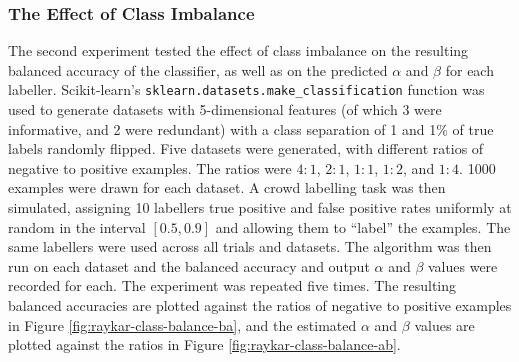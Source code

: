         \subsubsection{The Effect of Class Imbalance}

            The second experiment tested the effect of class imbalance on the
            resulting balanced accuracy of the classifier, as well as on the
            predicted $\alpha$ and $\beta$ for each labeller. Scikit-learn's
            \citep{scikit-learn} \texttt{sklearn.datasets.make\_classification}
            function was used to generate datasets with 5-dimensional features
            (of which 3 were informative, and 2 were redundant) with a class
            separation of 1 and 1\% of true labels randomly flipped. Five
            datasets were generated, with different ratios of negative to
            positive examples. The ratios were $4:1$, $2:1$, $1:1$, $1:2$, and
            $1:4$. 1000 examples were drawn for each dataset. A crowd labelling
            task was then simulated, assigning 10 labellers true positive and
            false positive rates uniformly at random in the interval $[0.5,
            0.9]$ and allowing them to ``label'' the examples. The same
            labellers were used across all trials and datasets. The
            \citeauthor{raykar10} algorithm was then run on each dataset and the
            balanced accuracy and output $\alpha$ and $\beta$ values were
            recorded for each. The experiment was repeated five times. The
            resulting balanced accuracies are plotted against the ratios of
            negative to positive examples in Figure
            \ref{fig:raykar-class-balance-ba}, and the estimated $\alpha$ and
            $\beta$ values are plotted against the ratios in Figure
            \ref{fig:raykar-class-balance-ab}.

